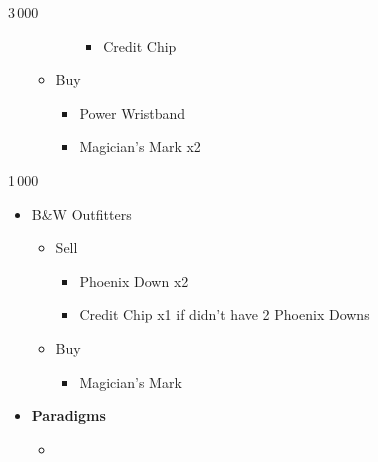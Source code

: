 \begin{paracol}{2}
\begin{shop}{3\,000}
\begin{itemize}
\begin{itemize}
\begin{itemize}
					                  \begin{itemize}
						                  \item Credit Chip
					                  \end{itemize}
				            \end{itemize}
				      \item Buy
				            \begin{itemize}
					            \item Power Wristband
					            \item Magician's Mark x2
				            \end{itemize}
			      \end{itemize}
		\end{itemize}
	\end{shop}
	\switchcolumn
	\begin{shop}{1\,000}
		\begin{itemize}
			\item B\&W Outfitters
			      \begin{itemize}
				      \item Sell
				            \begin{itemize}
					            \item Phoenix Down x2
					            \item Credit Chip x1 if didn't have 2 Phoenix Downs
				            \end{itemize}
				      \item Buy
				            \begin{itemize}
					            \item Magician's Mark
				            \end{itemize}
			      \end{itemize}
		\end{itemize}
	\end{shop}
	\switchcolumn*
	\begin{menu}
		\begin{itemize}
			\item \textbf{Paradigms}
			      \begin{itemize}
				      \item {}%
				            {\paradigmline{(\rav)}{\rav}{\rav}}%
				            {\paradigmline{\com}{\sen}{\med}}%
				            {\paradigmline[3]{\textit{[\com]}}{\textit{\com}}{\textit{\rav}}}%
				            {\paradigmline{[\com]}{\com}{\rav}}
			      \end{itemize}

\end{itemize}
\end{menu}
\end{paracol}
